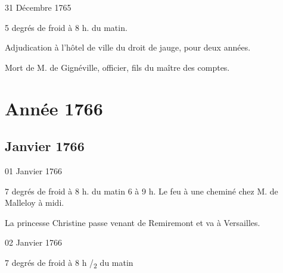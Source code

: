                     \begin{diary}{31 Décembre 1765}{}
                        
                        
                           5 degrés de froid à 8 h. du matin. \bigskip
        
        
                         Adjudication à l'hôtel de ville du droit
                           de jauge, pour deux
                           années. \bigskip
        
        
                         Mort de M.
                              de Gignéville, officier,
                           fils du maître des comptes. \bigskip
        
        
                        
                     \end{diary}
                  
               \part*{Année 1766}\chapter*{Janvier 1766}
                     
                     
                     
                     \begin{diary}{01 Janvier 1766}{}
                        
                        
                           7 degrés de froid à 8 h. du matin
                           6 à 9 h.
                           Le feu à une cheminé 
                           chez
                           M. de Malleloy
                           à midi. \bigskip
        
        
                        
                           La princesse Christine passe
                           venant
                           de Remiremont et va à
                              Versailles. \bigskip
        
        
                     \end{diary}

                     \begin{diary}{02 Janvier 1766}{}
                        
                        
                           7 degrés de froid à 8 h /\textsubscript{2} du matin
                        \bigskip
        
        
                     \end{diary}

